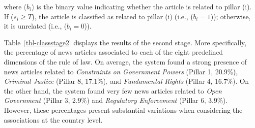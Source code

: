 \documentclass[
]{agujournal2019}
\begin{document}
where (\(b_i\)) is the binary value indicating whether the article is
related to pillar (i). If (\(s_i \geq T\)), the article is classified as
related to pillar (i) (i.e., (\(b_i = 1\))); otherwise, it is unrelated
(i.e., (\(b_i = 0\))).

Table~\ref{tbl-classstage2} displays the results of the second stage.
More specifically, the percentage of news articles associated to each of
the eight predefined dimensions of the rule of law. On average, the
system found a strong presence of news articles related to
\emph{Constraints on Government Powers} (Pillar 1, 20.9\%),
\emph{Criminal Justice} (Pillar 8, 17.1\%), and \emph{Fundamental
Rights} (Pillar 4, 16.7\%). On the other hand, the system found very few
news articles related to \emph{Open Government} (Pillar 3, 2.9\%) and
\emph{Regulatory Enforcement} (Pillar 6, 3.9\%). However, these
percentages present substantial variations when considering the
associations at the country level.
\end{document}
